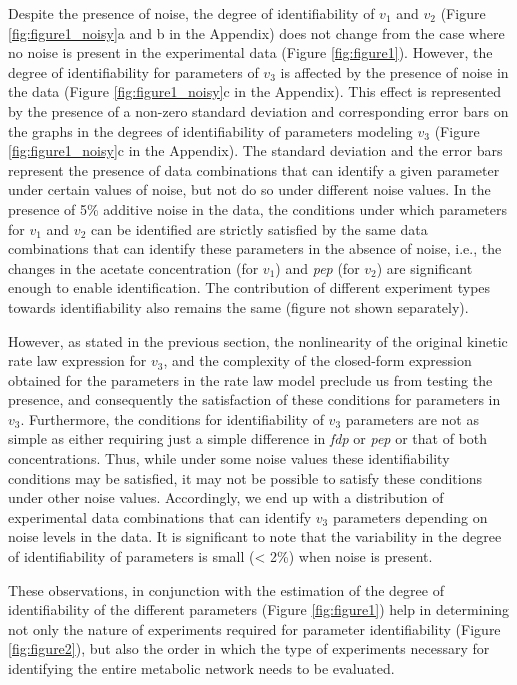 \documentclass[10pt]{article}
\begin{document}
Despite the presence of noise, the degree of identifiability of $v_1$ and $v_2$ (Figure \ref{fig:figure1_noisy}a and b in the Appendix) does not change from the case where no noise is present in the experimental data (Figure \ref{fig:figure1}). However, the degree of identifiability for parameters of $v_3$ is affected by the presence of noise in the data (Figure \ref{fig:figure1_noisy}c in the Appendix). This effect is represented by the presence of a non-zero standard deviation and corresponding error bars on the graphs in the degrees of identifiability of parameters modeling $v_3$ (Figure \ref{fig:figure1_noisy}c in the Appendix). The standard deviation and the error bars represent the presence of data combinations that can identify a given parameter under certain values of noise, but not do so under different noise values. In the presence of 5\% additive noise in the data, the conditions under which parameters for $v_1$ and $v_2$ can be identified are strictly satisfied by the same data combinations that can identify these parameters in the absence of noise, i.e., the changes in the acetate concentration (for $v_1$) and \textit{pep} (for $v_2$) are significant enough to enable identification. The contribution of different experiment types towards identifiability also remains the same (figure not shown separately).

However, as stated in the previous section, the nonlinearity of the original kinetic rate law expression for $v_3$, and the complexity of the closed-form expression obtained for the parameters in the rate law model preclude us from testing the presence, and consequently the satisfaction of these conditions for parameters in $v_3$. Furthermore, the conditions for identifiability of $v_3$ parameters are not as simple as either requiring just a simple difference in \textit{fdp} or \textit{pep} or that of both concentrations. Thus, while under some noise values these identifiability conditions may be satisfied, it may not be possible to satisfy these conditions under other noise values. Accordingly, we end up with a distribution of experimental data combinations that can identify $v_3$ parameters depending on noise levels in the data. It is significant to note that the variability in the degree of identifiability of parameters is small (< 2\%) when noise is present.

These observations, in conjunction with the estimation of the degree of identifiability of the different parameters (Figure \ref{fig:figure1}) help in determining not only the nature of experiments required for parameter identifiability (Figure \ref{fig:figure2}), but also the order in which the type of experiments necessary for identifying the entire metabolic network needs to be evaluated.
\end{document}
